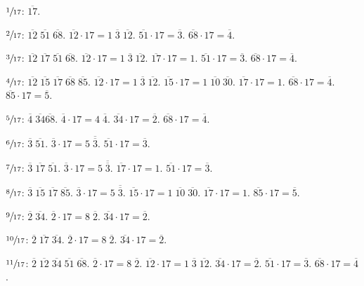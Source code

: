 \documentclass{article}
\theoremstyle{definition}
\begin{document}
$\sfrac{1}{17}$: $\overline{17}$.

$\sfrac{2}{17}$: $\overline{12} \; \overline{51} \; \overline{68}$.
$\overline{12} \cdot 17 = 1 \; \overline{3} \; \overline{12}$.
$\overline{51} \cdot 17 = \overline{3}$.
$\overline{68} \cdot 17 = \overline{4}$.

$\sfrac{3}{17}$: $\overline{12} \; \overline{17} \; \overline{51} \; \overline{68}$. 
$\overline{12} \cdot 17 = 1 \; \overline{3} \; \overline{12}$.
$\overline{17} \cdot 17 = 1$.
$\overline{51} \cdot 17 = \overline{3}$.
$\overline{68} \cdot 17 = \overline{4}$.

$\sfrac{4}{17}$: $\overline{12} \; \overline{15} \; \overline{17} \; \overline{68} \; \overline{85}$.
$\overline{12} \cdot 17 = 1 \; \overline{3} \; \overline{12}$.
$\overline{15} \cdot 17 = 1 \; \overline{10} \; \overline{30}$.
$\overline{17} \cdot 17 = 1$.
$\overline{68} \cdot 17 = \overline{4}$.
$\overline{85} \cdot 17 = \overline{5}$.

$\sfrac{5}{17}$: $\overline{4} \; \overline{34} \overline{68}$.
$\overline{4} \cdot 17 = 4 \; \overline{4}$.
$\overline{34} \cdot 17 = \overline{2}$.
$\overline{68} \cdot 17 = \overline{4}$.

$\sfrac{6}{17}$: $\overline{3} \; \overline{51}$.
$\overline{3} \cdot 17 = 5 \; \overline{\overline{3}}$.
$\overline{51} \cdot 17 = \overline{3}$.

$\sfrac{7}{17}$: $\overline{3} \; \overline{17} \; \overline{51}$.
$\overline{3} \cdot 17 = 5 \; \overline{\overline{3}}$.
$\overline{17} \cdot 17 =1$.
$\overline{51} \cdot 17 = \overline{3}$.

$\sfrac{8}{17}$: $\overline{3} \; \overline{15} \; \overline{17} \; \overline{85}$.
$\overline{3} \cdot 17 = 5 \; \overline{\overline{3}}$.
$\overline{15} \cdot 17 = 1 \; \overline{10} \; \overline{30}$.
$\overline{17} \cdot 17 = 1$.
$\overline{85} \cdot 17 = \overline{5}$.

$\sfrac{9}{17}$: $\overline{2} \; \overline{34}$.
$\overline{2} \cdot 17 = 8 \; \overline{2}$.
$\overline{34} \cdot 17 = \overline{2}$.

$\sfrac{10}{17}$: $\overline{2} \; \overline{17} \; \overline{34}$.
$\overline{2} \cdot 17 = 8 \; \overline{2}$.
$\overline{34} \cdot 17 = \overline{2}$.

$\sfrac{11}{17}$: $\overline{2} \; \overline{12} \; \overline{34} \; \overline{51} \; \overline{68}$.
$\overline{2} \cdot 17 = 8 \; \overline{2}$.
$\overline{12} \cdot 17 = 1 \; \overline{3} \; \overline{12}$.
$\overline{34} \cdot 17 = \overline{2}$.
$\overline{51} \cdot 17 = \overline{3}$.
$\overline{68} \cdot 17 = \overline{4}$.
\end{document}
